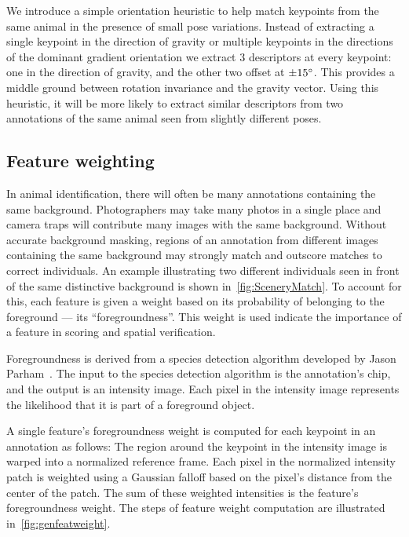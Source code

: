         We introduce a simple orientation heuristic to help match keypoints
          from the same animal in the presence of small pose variations.
        Instead of extracting a single keypoint in the direction of gravity or
          multiple keypoints in the directions of the dominant gradient
          orientation we extract 3 descriptors at every keypoint:
        one in the direction of gravity, and the other two offset at
          $\pm15^{\circ}$.
        This provides a middle ground between rotation invariance and the
          gravity vector.
        Using this heuristic, it will be more likely to extract similar
          descriptors from two annotations of the same animal seen from slightly
          different poses.


    \subsection{Feature weighting}
     
        In animal identification, there will often be many annotations
          containing the same background.
        Photographers may take many photos in a single place and camera
          traps will contribute many images with the same background.
        Without accurate background masking, regions of an annotation
          from different images containing the same background may
          strongly match and outscore matches to correct individuals.
        An example illustrating two different individuals seen in front
          of the same distinctive background is shown
          in~\cref{fig:SceneryMatch}.
        To account for this, each feature is given a weight based on
          its probability of belonging to the foreground --- its
          ``foregroundness''.
        This weight is used indicate the importance of a feature in
          scoring and spatial verification.

        Foregroundness is derived from a species detection algorithm
          developed by Jason Parham~\cite{parham_photographic_2015}.
        The input to the species detection algorithm is the
          annotation's chip, and the output is an intensity image.
        Each pixel in the intensity image represents the likelihood
          that it is part of a foreground object.

        A single feature's foregroundness weight is computed for each
          keypoint in an annotation as follows:
        The region around the keypoint in the intensity image is warped
          into a normalized reference frame.
        Each pixel in the normalized intensity patch is weighted using
          a Gaussian falloff based on the pixel's distance from the
          center of the patch.
        The sum of these weighted intensities is the feature's
          foregroundness weight.
        The steps of feature weight computation are illustrated
          in~\cref{fig:genfeatweight}.

